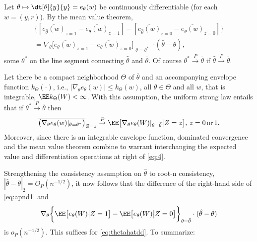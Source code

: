  Let $\theta \mapsto \dt[\theta]{y}{y} = e_{\theta}(w)$ be
continuously differentiable (for each $w = (y, {r})$).
By the mean value theorem,
\begin{multline} \label{eq:apnd1}
\big\{ [\overline{e_{\hat{\theta} }({w})}_{z=1}
  -\overline{e_{\bar{\theta}}({w})}_{z=1} ] -
      [\overline{e_{\hat{\theta} }({w})}_{z=0}
      -\overline{e_{\bar{\theta}}({w})}_{z=0} ] \big\}\\
  = \nabla_{\theta} \big[\overline{ e_{\theta}({w}) }_{z=1} -
  \overline{ e_{\theta}({w})
  }_{z=0}\big]_{\substack{\theta=\theta^{*} } }
\cdot  (\hat\theta - \bar\theta) ,
\end{multline}
some $\theta^{*}$ on the line segment connecting $\hat\theta$ and
$\bar\theta$.   Of course $\theta^{*} \stackrel{P}{\rightarrow}
\bar\theta$ if $\hat\theta \stackrel{P}{\rightarrow} \bar\theta$.

Let there be a compact neighborhood $\Theta$ of $\bar\theta$ and an
 accompanying envelope function $k_{\Theta}(\cdot)$,  i.e.,
 $|\nabla_{\theta} e_{\theta}(w )| \leq
k_{\Theta}(w)$, all $\theta \in \Theta$ and all $w$, that is integrable, $\EE k_{\Theta}(W) < \infty$.
With this assumption, the uniform strong law
\citep[e.g.,][Ch.16]{ferguson1996largesampletheory} entails that
if $\theta^{*} \stackrel{P}{\rightarrow} \bar\theta$ then
\begin{equation}
  \overline{\big( \nabla_{\theta }e_{\theta}({w})
    |_{\theta=\theta^{*}} \big)}_{Z=z} \stackrel{P}{\rightarrow} \EE
  \big[\nabla_{\theta} e_{\theta}(W) |_{\theta =
    \bar\theta} \big| Z=z\big], \, z=0\, \mathrm{or}\, 1. \label{eq:4}
\end{equation}
Moreover, since there is an integrable envelope function, dominated convergence and the mean value theorem combine to warrant interchanging the expected value and differentiation operations at right of \eqref{eq:4}.

Strengthening the consistency assumption on $\hat\theta$ to root-n consistency, $| \hat\theta - \bar\theta |_{2} = O_{P}(n^{-1/2})$, it now
follows that the difference of the right-hand side of \eqref{eq:apnd1} and
\begin{equation} \label{eq:appendix1}
\nabla_{\theta} \bigg\{\EE \big[
e_{\theta}(W)
\big| Z=1\big]   - \EE \big[
e_{\theta}(W)
\big| Z=0\big] \bigg\}_{\theta=\bar\theta}   \cdot (\hat\theta - \bar\theta)
\end{equation}
is $o_{P}(n^{-1/2})$. This suffices for
\eqref{eq:thetahatdd}.  To summarize:

